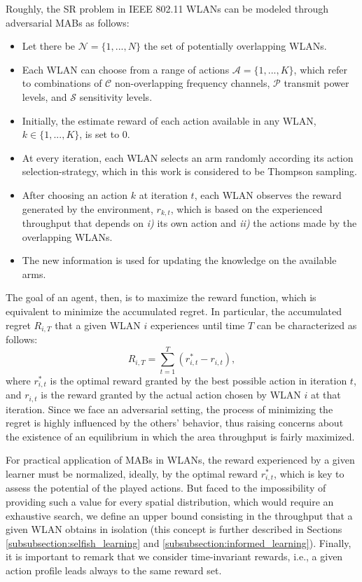 \documentclass[preprint,12pt]{elsarticle}
\begin{document}
Roughly, the SR problem in IEEE 802.11 WLANs can be modeled through adversarial MABs as follows:	
\begin{itemize}
	\item Let there be $\mathcal{N} = \{1,..., N\}$ the set of potentially overlapping WLANs.
	\item Each WLAN can choose from a range of actions $\mathcal{A} = \{1,..., K\}$, which refer to combinations of $\mathcal{C}$ non-overlapping frequency channels, $\mathcal{P}$ transmit power levels, and $\mathcal{S}$ sensitivity levels.
	\item Initially, the estimate reward of each action available in any WLAN, $k \in \{1,...,K\}$, is set to 0.
	\item At every iteration, each WLAN selects an arm randomly according its action selection-strategy, which in this work is considered to be Thompson sampling.
	\item After choosing an action $k$ at iteration $t$, each WLAN observes the reward generated by the environment, $r_{k,t}$, which is based on the experienced throughput that depends on \emph{i)} its own action and \emph{ii)} the actions made by the overlapping WLANs.
	\item The new information is used for updating the knowledge on the available arms.
\end{itemize}

The goal of an agent, then, is to maximize the reward function, which is equivalent to minimize the accumulated regret. In particular, the accumulated regret $R_{i,T}$ that a given WLAN $i$ experiences until time $T$ can be characterized as follows:
\begin{equation}
R_{i,T} = \sum_{t = 1}^{T} (r_{i,t}^* - r_{i,t}),
\nonumber
\end{equation}
where $r_{i,t}^*$ is the optimal reward granted by the best possible action in iteration $t$, and $r_{i,t}$ is the reward granted by the actual action chosen by WLAN $i$ at that iteration. Since we face an adversarial setting, the process of minimizing the regret is highly influenced by the others' behavior, thus raising concerns about the existence of an equilibrium in which the area throughput is fairly maximized. 

For practical application of MABs in WLANs, the reward experienced by a given learner must be normalized, ideally, by the optimal reward $r_{i,t}^*$, which is key to assess the potential of the played actions. But faced to the impossibility of providing such a value for every spatial distribution, which would require an exhaustive search, we define an upper bound consisting in the throughput that a given WLAN obtains in isolation (this concept is further described in Sections \ref{subsubsection:selfish_learning} and \ref{subsubsection:informed_learning}). Finally, it is important to remark that we consider time-invariant rewards, i.e., a given action profile leads always to the same reward set.
\end{document}
